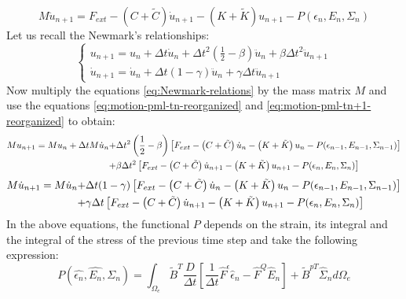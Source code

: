 \begin{equation}
M \ddot{u}_{n+1} = F_{ext} -\left(C+\tilde{C}\right)\dot{u}_{n+1} 
-\left(K+\tilde{K}\right)u_{n+1} - P(\epsilon_{n},E_{n},\Sigma_{n})
\label{eq:motion-pml-tn+1-reorganized}
\end{equation}
Let us recall the Newmark's relationships:
\begin{equation}
	\begin{cases}
		u_{n+1} = u_n + \Delta t \dot{u}_n + \Delta t^2 \left(\frac{1}{2}-\beta\right)\ddot{u}_n + \beta \Delta t^2 \ddot{u}_{n+1} \\
		\dot{u}_{n+1} = \dot{u}_n + \Delta t (1-\gamma) \ddot{u}_n + \gamma \Delta t \ddot{u}_{n+1}
	\end{cases}
	\label{eq:Newmark-relations}
\end{equation}
Now multiply the equations \ref{eq:Newmark-relations} by the mass matrix $M$ and use the equations \ref{eq:motion-pml-tn-reorganized} and \ref{eq:motion-pml-tn+1-reorganized} to obtain:
\begin{align}
		M u_{n+1} = M u_n + \Delta t M \dot{u}_n + &  \Delta t^2 \left(\frac{1}{2}-\beta\right)\left[ F_{ext} -\left(C+\tilde{C}\right)\dot{u}_n -\left(K+\tilde{K}\right)u_n - P(\epsilon_{n-1},E_{n-1},\Sigma_{n-1}) \right]  \notag\\ + &  \beta \Delta t^2 \left[ F_{ext} -\left(C+\tilde{C}\right)\dot{u}_{n+1} 
-\left(K+\tilde{K}\right)u_{n+1} - P(\epsilon_{n},E_{n},\Sigma_{n}) \right] 
	\label{eq:main-relations1}
\end{align}
\begin{align}
		M \dot{u}_{n+1} = M \dot{u}_n +  &\Delta t (1-\gamma) \left[ F_{ext} -\left(C+\tilde{C}\right)\dot{u}_n 
-\left(K+\tilde{K}\right)u_n - P(\epsilon_{n-1},E_{n-1},\Sigma_{n-1}) \right] \notag\\ + & \gamma \Delta t \left[ F_{ext} -\left(C+\tilde{C}\right)\dot{u}_{n+1} 
-\left(K+\tilde{K}\right)u_{n+1} - P(\epsilon_{n},E_{n},\Sigma_{n}) \right] 
	\label{eq:main-relations2}
\end{align}
In the above equations, the functional $P$ depends on the strain, its integral and the integral of the stress of the previous time step and take the following expression:
\begin{equation}
P(\hat{\epsilon_n},\hat{E_n},\hat{\Sigma_n}) = \int_{\Omega_e} \tilde{B}^T \frac{D}{\Delta t}\left[\frac{1}{\Delta t} \hat{F}^\epsilon \hat{\epsilon}_n - \hat{F}^Q \hat{E}_n  \right] + \tilde{B}^{p T} \hat{\Sigma}_n d\Omega_e
\label{eq:P-exp}
\end{equation}
